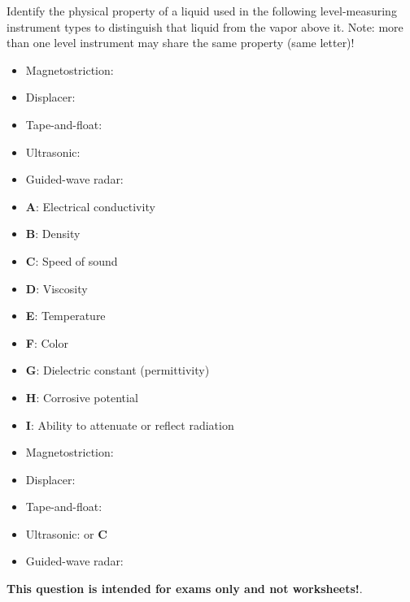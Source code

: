 

Identify the physical property of a liquid used in the following level-measuring instrument types to distinguish that liquid from the vapor above it.  Note: more than one level instrument may share the same property (same letter)!

\begin{itemize}
\item{} Magnetostriction: \underbar{\hskip 50pt}
\item{} Displacer: \underbar{\hskip 50pt}
\item{} Tape-and-float: \underbar{\hskip 50pt}
\item{} Ultrasonic: \underbar{\hskip 50pt}
\item{} Guided-wave radar: \underbar{\hskip 50pt}
\end{itemize}

\vskip 10pt

\begin{itemize}
\item {\bf A}: Electrical conductivity
\item {\bf B}: Density
\item {\bf C}: Speed of sound
\item {\bf D}: Viscosity
\item {\bf E}: Temperature
\item {\bf F}: Color
\item {\bf G}: Dielectric constant (permittivity)
\item {\bf H}: Corrosive potential
\item {\bf I}: Ability to attenuate or reflect radiation
\end{itemize}







\begin{itemize}
\item{} Magnetostriction: 
\item{} Displacer: 
\item{} Tape-and-float: 
\item{} Ultrasonic:  or {\bf C}
\item{} Guided-wave radar: 
\end{itemize}







{\bf This question is intended for exams only and not worksheets!}.



